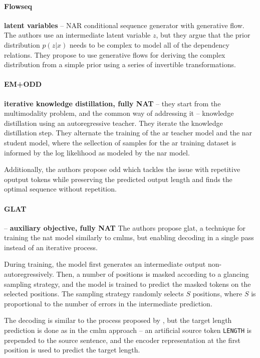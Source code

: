 \paragraph{Flowseq} \textbf{latent variables} \citep{ma-etal-2019-flowseq} --
NAR conditional sequence generator with generative flow. The authors use an
intermediate latent variable $z$, but they argue that the prior distribution
$p(z|x)$ needs to be complex to model all of the dependency relations. They
propose to use generative flows \citep{rezende2015variational} for deriving the
complex distribution from a simple prior using a series of invertible
transformations. 

\paragraph{EM+ODD} \textbf{iterative knowledge distillation, fully NAT}
\citep{sun2020em} -- they start from the multimodality problem, and the common
way of addressing it -- knowledge distillation using an autoregressive
teacher. They iterate the knowledge distillation step. They alternate the
training of the \ac{ar} teacher model and the \ac{nar} student model, where the
sellection of samples for the \ac{ar} training dataset is informed by the log
likelihood as modeled by the \ac{nar} model.

Additionally, the authors propose \acf{odd} which tackles the issue with
repetitive oputput tokens while preserving the predicted output length and
finds the optimal sequence without repetition.


\paragraph{GLAT} \citep{qian2020glancing} -- \textbf{auxiliary objective, fully
  NAT} The authors propose \acf{glat}, a technique for training the \ac{nat}
model similarly to \acp{cmlm}, but enabling decoding in a single pass instead
of an iterative process.

During training, the model first generates an intermediate output
non-autoregressively. Then, a number of positions is masked according to a
glancing sampling strategy, and the model is trained to predict the masked
tokens on the selected positions.  The sampling strategy
randomly selects $S$ positions, where $S$ is proportional to the number of
errors in the intermediate prediction.

The decoding is similar to the process proposed by
\citet{gu2017nonautoregressive}, but the target length prediction is done as in
the \ac{cmlm} approach -- an artificial source token \texttt{LENGTH} is
prepended to the source sentence, and the encoder representation at the first
position is used to predict the target length.


